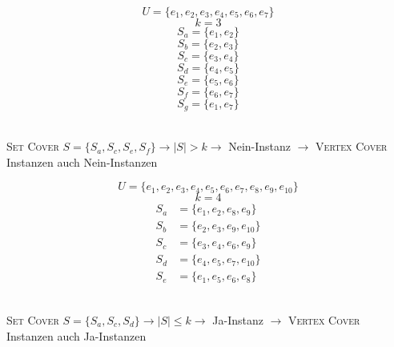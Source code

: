 \documentclass[a4paper, 12pt, margins=3cm]{homework}
\begin{document}
  \begin{problem}
    
  \end{problem}
  \begin{solution}\hfill
    \begin{center}
      \def\svgwidth{1\textwidth} 
    \end{center}

    
  \end{solution}


  \begin{problem}
    
  \end{problem}
  \begin{solution} \hfill

    \begin{minipage}{0.5\textwidth}
      \begin{center}
        \def\svgwidth{1\textwidth} 
      \end{center}
    \end{minipage}
    \begin{minipage}{0.5\textwidth}
      \[ U = \{ e_1, e_2, e_3, e_4, e_5, e_6, e_7 \} \]
      \[ k = 3 \]
      \[ S_a = \{e_1, e_2\} \]
      \[ S_b = \{e_2, e_3\} \]
      \[ S_c = \{e_3, e_4\} \]
      \[ S_d = \{e_4, e_5\} \]
      \[ S_e = \{e_5, e_6\} \]
      \[ S_f = \{e_6, e_7\} \]
      \[ S_g = \{e_1, e_7\} \]
    \end{minipage} \\

    \textsc{Set Cover} $S = \{S_a, S_c, S_e, S_f \} \rightarrow |S| > k \rightarrow$ Nein-Instanz $\rightarrow$ \textsc{Vertex Cover} Instanzen auch Nein-Instanzen \\

    \begin{minipage}{0.5\textwidth}
      \begin{center}
        \def\svgwidth{1\textwidth} 
      \end{center}
    \end{minipage}
    \begin{minipage}{0.5\textwidth}
      \[ U = \{ e_1, e_2, e_3, e_4, e_5, e_6, e_7, e_8, e_9, e_{10} \} \]
      \[ k = 4 \]
      \begin{align*}
        S_a &= \{e_1, e_2, e_8, e_9\} \\
        S_b &= \{e_2, e_3, e_9, e_{10}\} \\
        S_c &= \{e_3, e_4, e_6, e_9\} \\
        S_d &= \{e_4, e_5, e_7, e_{10}\} \\
        S_e &= \{e_1, e_5, e_6, e_8\}
      \end{align*}
    \end{minipage} \\

    \textsc{Set Cover} $S = \{S_a, S_c, S_d\} \rightarrow |S| \leq k \rightarrow$ Ja-Instanz $\rightarrow$ \textsc{Vertex Cover} Instanzen auch Ja-Instanzen

    
  \end{solution}
\end{document}
